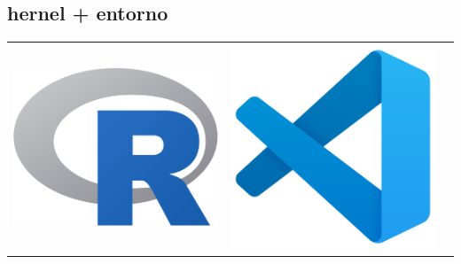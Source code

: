\documentclass{article}
\begin{document}
\subsection{hernel + entorno}

\hfill \break
\newline
\begin{center}
\begin{tabular}{c c c}
\includegraphics[scale=0.1]{r.png} & 
\includegraphics[scale=0.1]{vscode.png}  & 

\end{tabular}
\end{center}
\end{document}
